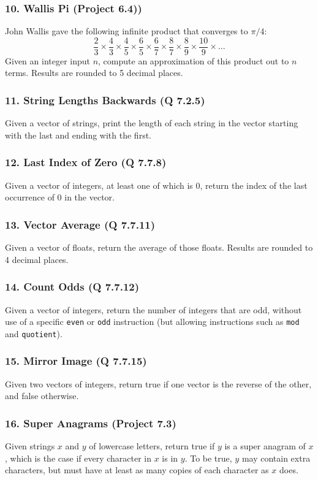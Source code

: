 \documentclass{sig-alternate}
\begin{document}
\subsubsection*{10. Wallis Pi (Project 6.4))}
John Wallis gave the following infinite product that converges to $\pi/4$:
\[
\frac{2}{3}\times \frac{4}{3}\times \frac{4}{5}\times \frac{6}{5}\times \frac{6}{7}\times \frac{8}{7}\times \frac{8}{9}\times \frac{10}{9} \times ...
\]
Given an integer input $n$, compute an approximation of this product out to $n$ terms. Results are rounded to 5 decimal places.

\subsubsection*{11. String Lengths Backwards (Q 7.2.5)}
Given a vector of strings, print the length of each string in the vector starting with the last and ending with the first.

\subsubsection*{12. Last Index of Zero (Q 7.7.8)}
Given a vector of integers, at least one of which is 0, return the index of the last occurrence of 0 in the vector.

\subsubsection*{13. Vector Average (Q 7.7.11)}
Given a vector of floats, return the average of those floats. Results are rounded to 4 decimal places.

\subsubsection*{14. Count Odds (Q 7.7.12)}
Given a vector of integers, return the number of integers that are odd, without use of a specific \texttt{even} or \texttt{odd} instruction (but allowing instructions such as \texttt{mod} and \texttt{quotient}).

\subsubsection*{15. Mirror Image (Q 7.7.15)}
Given two vectors of integers, return true if one vector is the reverse of the other, and false otherwise.

\subsubsection*{16. Super Anagrams (Project 7.3)}
Given strings $x$ and $y$ of lowercase letters, return true if $y$ is a super anagram of $x$, which is the case if every character in $x$ is in $y$. To be true, $y$ may contain extra characters, but must have at least as many copies of each character as $x$ does.
\end{document}
